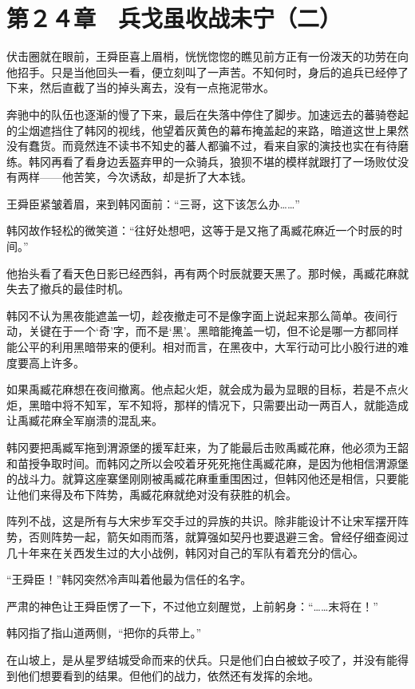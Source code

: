 \section{第２４章　兵戈虽收战未宁（二）}

伏击圈就在眼前，王舜臣喜上眉梢，恍恍惚惚的瞧见前方正有一份泼天的功劳在向他招手。只是当他回头一看，便立刻叫了一声苦。不知何时，身后的追兵已经停了下来，然后直截了当的掉头离去，没有一点拖泥带水。

奔驰中的队伍也逐渐的慢了下来，最后在失落中停住了脚步。加速远去的蕃骑卷起的尘烟遮挡住了韩冈的视线，他望着灰黄色的幕布掩盖起的来路，暗道这世上果然没有蠢货。而竟然连不读书不知史的蕃人都骗不过，看来自家的演技也实在有待磨练。韩冈再看了看身边丢盔弃甲的一众骑兵，狼狈不堪的模样就跟打了一场败仗没有两样——他苦笑，今次诱敌，却是折了大本钱。

王舜臣紧皱着眉，来到韩冈面前：“三哥，这下该怎么办……”

韩冈故作轻松的微笑道：“往好处想吧，这等于是又拖了禹臧花麻近一个时辰的时间。”

他抬头看了看天色日影已经西斜，再有两个时辰就要天黑了。那时候，禹臧花麻就失去了撤兵的最佳时机。

韩冈不认为黑夜能遮盖一切，趁夜撤走可不是像字面上说起来那么简单。夜间行动，关键在于一个‘奇’字，而不是‘黑’。黑暗能掩盖一切，但不论是哪一方都同样能公平的利用黑暗带来的便利。相对而言，在黑夜中，大军行动可比小股行进的难度要高上许多。

如果禹臧花麻想在夜间撤离。他点起火炬，就会成为最为显眼的目标，若是不点火炬，黑暗中将不知军，军不知将，那样的情况下，只需要出动一两百人，就能造成让禹臧花麻全军崩溃的混乱来。

韩冈要把禹臧军拖到渭源堡的援军赶来，为了能最后击败禹臧花麻，他必须为王韶和苗授争取时间。而韩冈之所以会咬着牙死死拖住禹臧花麻，是因为他相信渭源堡的战斗力。就算这座寨堡刚刚被禹臧花麻重重围困过，但韩冈他还是相信，只要能让他们来得及布下阵势，禹臧花麻就绝对没有获胜的机会。

阵列不战，这是所有与大宋步军交手过的异族的共识。除非能设计不让宋军摆开阵势，否则阵势一起，箭矢如雨而落，就算强如契丹也要退避三舍。曾经仔细查阅过几十年来在关西发生过的大小战例，韩冈对自己的军队有着充分的信心。

“王舜臣！”韩冈突然冷声叫着他最为信任的名字。

严肃的神色让王舜臣愣了一下，不过他立刻醒觉，上前躬身：“……末将在！”

韩冈指了指山道两侧，“把你的兵带上。”

在山坡上，是从星罗结城受命而来的伏兵。只是他们白白被蚊子咬了，并没有能得到他们想要看到的结果。但他们的战力，依然还有发挥的余地。

